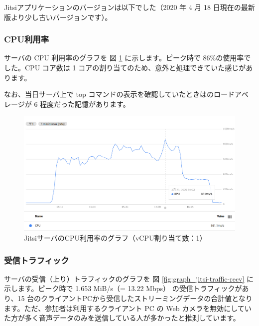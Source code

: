 \documentclass[mingoth,a4paper]{jsarticle}
\begin{document}
Jitsiアプリケーションのバージョンは以下でした（2020 年 4 月 18 日現在の最新版より少し古いバージョンです）。



\subsubsection{CPU利用率}

サーバの CPU 利用率のグラフを 図 \ref{fig:graph_jitsi-cpu-usage} に示します。ピーク時で 86\%の使用率でした。CPU コア数は 1 コアの割り当てのため、意外と処理できていた感じがあります。

なお、当日サーバ上で top コマンドの表示を確認していたときはのロードアベレージが 6 程度だった記憶があります。

\begin{figure}[h]
\begin{center}
  \includegraphics[keepaspectratio,width=0.75\hsize]{image202004/jitsi_perf_cpu_usage.png}
\end{center}
\caption{JitsiサーバのCPU利用率のグラフ（vCPU割り当て数：1）}
\label{fig:graph_jitsi-cpu-usage}
\end{figure}


\subsubsection{受信トラフィック}

サーバの受信（上り）トラフィックのグラフを 図 \ref{fig:graph_jitsi-traffic-recv} に示します。ピーク時で 1.653 MiB/s（= 13.22 Mbps） の受信トラフィックがあり、15 台のクライアントPCから受信したストリーミングデータの合計値となります。ただ、参加者は利用するクライアント PC の Web カメラを無効にしていた方が多く音声データのみを送信している人が多かったと推測しています。
\end{document}
